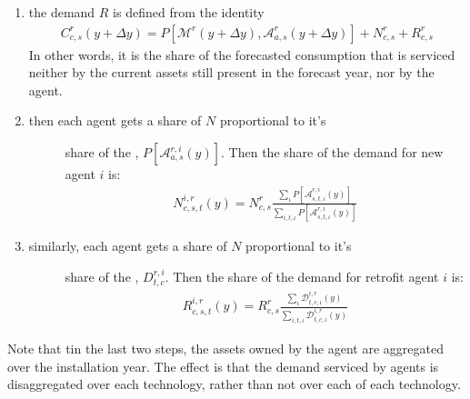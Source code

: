 \documentclass[letterpaper,10pt,english]{sphinxmanual}
\begin{document}
\begin{fulllineitems}
\begin{enumerate}
\item {} 
the  demand \(R\) is defined from the identity
\begin{equation*}
\begin{split}C_{c, s}^r(y + \Delta y) =
 P[\mathcal{M}^r(y+\Delta y), \mathcal{A}_{a, s}^r(y + \Delta y)]
 + N_{c, s}^r
 + R_{c, s}^r\end{split}
\end{equation*}
In other words, it is the share of the forecasted consumption that is serviced
neither by the current assets still present in the forecast year, nor by the
 agent.

\item {} \begin{description}
\item[{then each  agent gets a share of \(N\) proportional to it’s}] \leavevmode
share of the ,
\(P[\mathcal{A}_{a, s}^{r, i}(y)]\).  Then the share of the demand for new
agent \(i\) is:
\begin{equation*}
\begin{split}N_{c, s, t}^{i, r}(y) = N_{c, s}^r
    \frac{\sum_\iota P[\mathcal{A}_{s, t, \iota}^{r, i}(y)]}
         {\sum_{i, t, \iota}P[\mathcal{A}_{s, t, \iota}^{r, i}(y)]}\end{split}
\end{equation*}
\end{description}

\item {} \begin{description}
\item[{similarly, each  agent gets a share of \(N\) proportional to it’s}] \leavevmode
share of the , \(D^{r, i}_{t, c}\).
Then the share of the demand for retrofit agent \(i\) is:
\begin{equation*}
\begin{split}R_{c, s, t}^{i, r}(y) = R_{c, s}^r
    \frac{\sum_\iota\mathcal{D}_{t, c, \iota}^{i, r}(y)}
        {\sum_{i, t, \iota}\mathcal{D}_{t, c, \iota}^{i, r}(y)}\end{split}
\end{equation*}
\end{description}

\end{enumerate}

Note that tin the last two steps, the assets owned by the agent are aggregated over
the installation year. The effect is that the demand serviced by agents is
disaggregated over each technology, rather than not over each  of each
technology.



\end{fulllineitems}
\end{document}
